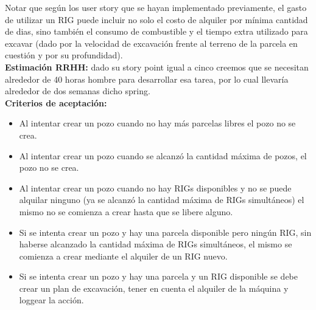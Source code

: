 Notar que según los user story que se hayan implementado previamente, el gasto de utilizar un RIG puede incluir no solo el costo de alquiler por mínima cantidad de dias, sino también el consumo de combustible y el tiempo extra utilizado para excavar (dado por la velocidad de excavación frente al terreno de la parcela en cuestión y por su profundidad).\\

\textbf{Estimaci\'on RRHH:}
dado su story point igual a cinco creemos que se necesitan alrededor de 40 horas hombre para desarrollar esa tarea, por lo cual llevar\'ia alrededor de dos semanas dicho spring.\\

\textbf{Criterios de aceptaci\'on:}
\begin{itemize}
    \item Al intentar crear un pozo cuando no hay m\'as parcelas libres el pozo no se crea.
    \item Al intentar crear un pozo cuando se alcanzó la cantidad máxima de pozos, el pozo no se crea.
    \item Al intentar crear un pozo cuando no hay RIGs disponibles y no se puede alquilar ninguno (ya se alcanzó la cantidad máxima de RIGs simultáneos) el mismo no se comienza a crear hasta que se libere alguno.
    \item Si se intenta crear un pozo y hay una parcela disponible pero ningún RIG, sin haberse alcanzado la cantidad máxima de RIGs simultáneos, el mismo se comienza a crear mediante el alquiler de un RIG nuevo.
    \item Si se intenta crear un pozo y hay una parcela y un RIG disponible se debe crear un plan de excavaci\'on, tener en cuenta el alquiler de la m\'aquina y loggear la acci\'on.
\end{itemize}
